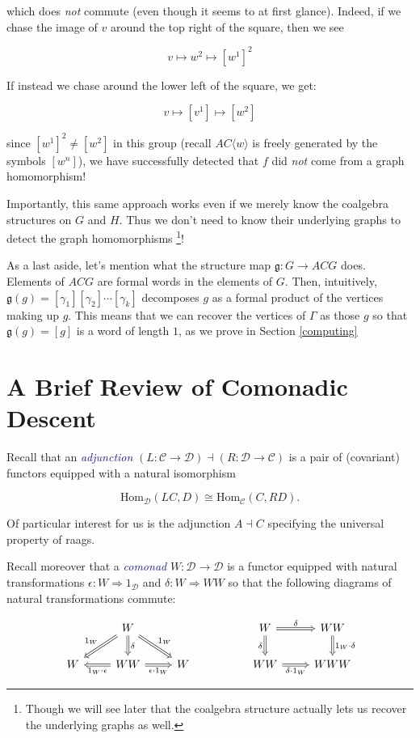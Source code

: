 \documentclass[12pt]{article}
\theoremstyle{definition}
\theoremstyle{theorem}
\newcommand*{\catVarFont}[1]{\mathcal{#1}}
\newcommand{\catC}{\catVarFont{C}}
\newcommand{\catD}{\catVarFont{D}}
\newcommand*{\important}[1]{\textcolor{MidnightBlue}{\emph{#1}}}
\begin{document}
which does \emph{not} commute (even though it seems to at first glance). 
Indeed, if we chase the image of $v$ around the top right of the square, then 
we see

\[ v \mapsto w^2 \mapsto [w^1]^2 \]

If instead we chase around the lower left of the square, we get:

\[ v \mapsto [v^1] \mapsto [w^2] \]

since $[w^1]^2 \neq [w^2]$ in this group (recall $AC \langle w \rangle$ is 
freely generated by the symbols $[w^n]$), we have successfully detected that 
$f$ did \emph{not} come from a graph homomorphism!

Importantly, this same approach works even if we merely know the 
coalgebra structures on $G$ and $H$. Thus we don't need to know their
underlying graphs to detect the graph homomorphisms%
\footnote{Though we will see later that the coalgebra structure 
actually lets us recover the underlying graphs as well.}! 

As a last aside, let's mention what the structure map 
$\mathfrak{g} : G \to ACG$ does. Elements of $ACG$ are 
formal words in the elements of $G$. Then, intuitively, 
$\mathfrak{g}(g) = [\gamma_1][\gamma_2]\cdots[\gamma_k]$ decomposes 
$g$ as a formal product of the vertices making up $g$. This means 
that we can recover the vertices of $\Gamma$ as those $g$ 
so that $\mathfrak{g}(g) = [g]$ is a word of length $1$, as we prove 
in Section \ref{computing}


\section{A Brief Review of Comonadic Descent}
\label{review}

Recall that an \important{adjunction}
$(L : \catC \to \catD) \dashv (R : \catD \to \catC)$ is a 
pair of (covariant) functors equipped with a natural isomorphism

\[ \text{Hom}_\mathcal{D}(LC,D) \cong \text{Hom}_\mathcal{C}(C,RD). \]

Of particular interest for us is the adjunction $A \dashv C$ specifying the 
universal property of raags.

Recall moreover that a \important{comonad} $W : \catD \to \catD$ is a 
functor equipped with natural transformations $\epsilon : W \Rightarrow 1_\catD$ 
and $\delta : W \Rightarrow WW$ so that the following diagrams of 
natural transformations commute:

\[
    \begin{tikzcd}
    & W &&& W & WW \\
    W & WW & W && WW & WWW
    \arrow["{1_W \cdot \epsilon}", Rightarrow, from=2-2, to=2-1]
    \arrow["{\epsilon \cdot 1_W}"', Rightarrow, from=2-2, to=2-3]
    \arrow["\delta", Rightarrow, from=1-2, to=2-2]
    \arrow["{1_W}"', Rightarrow, from=1-2, to=2-1]
    \arrow["{1_W}", Rightarrow, from=1-2, to=2-3]
    \arrow["\delta"', Rightarrow, from=1-5, to=2-5]
    \arrow["\delta", Rightarrow, from=1-5, to=1-6]
    \arrow["{\delta \cdot 1_W}"', Rightarrow, from=2-5, to=2-6]
    \arrow["{1_W \cdot \delta}", Rightarrow, from=1-6, to=2-6]
    \end{tikzcd}
\]
\end{document}
